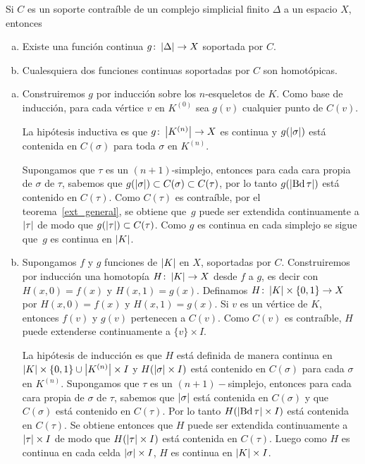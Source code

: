 \begin{Teo}\label{soportec}
Si $C$ es un soporte contraíble de un complejo simplicial finito $\Delta$ a un espacio $X$, entonces
\begin{enumerate}[(a)]
\item Existe una función continua $g\colon \left| \Delta \right|\rightarrow X$ soportada por $C$.
\item Cualesquiera dos funciones continuas soportadas por $C$ son homotópicas.
\end{enumerate}
\end{Teo}
\begin{Dem}
\begin{enumerate}[(a)]
\item Construiremos $g$ por inducción sobre los $n$-esqueletos de $K$. 
Como base de inducción, para cada vértice $v$ en $K^{(0)}$ sea $g(v)$ cualquier punto de $C(v)$.

La hipótesis inductiva es que $g\colon \left| K^{(n)} \right| \to X$ es continua y $g(\left| \sigma \right|)$ está contenida en $C(\sigma)$ para toda $\sigma$ en $K^{(n)}$.

Supongamos que $\tau$ es un $(n+1)$-simplejo, entonces para cada cara
propia de $\sigma$ de $\tau$, sabemos que $g(\left| \sigma \right|)\subset
C(\sigma)\subset C(\tau)$, por lo tanto $g(\left| \operatorname{Bd} \tau \right|)$ está
contenido en $C(\tau)$. Como $C(\tau)$ es contraíble, por el
teorema~\ref{ext_general}, se obtiene que~$g$ puede ser extendida continuamente a $\left| \tau \right|$ de modo que $g(\left| \tau \right|) \subset C(\tau)$. 
Como $g$ es continua en cada simplejo se sigue que~$g$ es continua en $\left| K \right|$.

\item Supongamos $f$ y $g$ funciones de $\left| K \right|$ en $X$, soportadas por $C$. Construiremos por inducción una homotopía $H\colon \left| K \right| \to X$ desde $f$ a $g$, es decir con $H(x,0) = f(x)$ y $H(x,1) = g(x)$.
Definamos $H\colon \left| K \right|\times\{0,1\} \to X$ por $H(x,0) = f(x)$ y $H(x,1) = g(x)$.
Si $v$ es un vértice de $K$, entonces $f(v)$ y $g(v)$ pertenecen a $C(v)$. Como $C(v)$ es contraíble, $H$ puede extenderse continuamente a $\{v\}\times I$.

La hipótesis de inducción es que $H$ está definida de manera continua en $\left| K \right|\times \{0,1\}\cup \left| K^{(n)} \right|\times I$ y $H(\left| \sigma \right|\times I)$ está contenido en $C(\sigma)$ para cada $\sigma$ en $K^{(n)}$.
Supongamos que $\tau$ es un $(n+1)-$simplejo, entonces para cada cara
propia de $\sigma$ de $\tau$, sabemos que $\left| \sigma \right|$ está
contenida en $C(\sigma)$ y que $C(\sigma)$ está contenido en
$C(\tau)$. Por lo tanto
$H(\left| \operatorname{Bd}\tau \right|\times I)$ está contenida en $C(\tau)$. Se obtiene
entonces que $H$ puede ser extendida continuamente a $\left| \tau \right|\times I$ de modo que $H(\left| \tau \right|\times I)$ está contenida en $C(\tau)$.
Luego como $H$ es continua en cada celda $\left| \sigma \right|\times I$, $H$ es continua en $\left| K \right|\times I$.

\end{enumerate}
\end{Dem}

